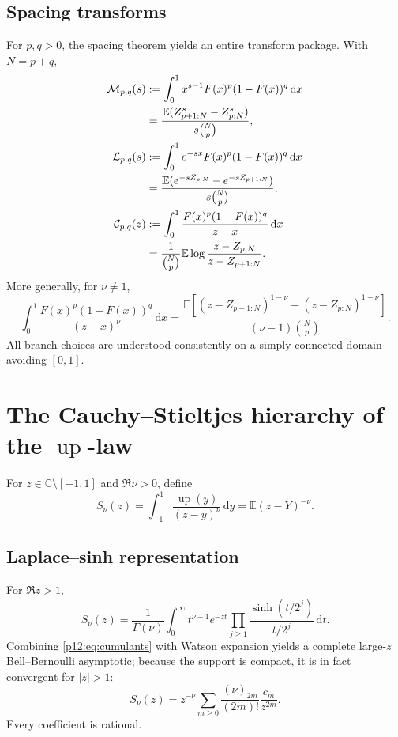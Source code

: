 \documentclass[11pt,oneside]{article}
\theoremstyle{definition}
\theoremstyle{remark}
\newcommand{\F}{F}
\newcommand{\Up}{\operatorname{up}}
\newcommand{\E}{\mathbb E}
\newcommand{\C}{\mathbb C}
\newcommand{\dd}{\,\mathrm d}
\newcommand{\1}{\mathbf 1}
\begin{document}
\subsection{Spacing transforms}

For \(p,q>0\), the spacing theorem yields an entire transform package.  With
\(N=p+q\),
\begin{align}
 \mathcal M_{p,q}(s)
 &:=\int_0^1x^{s-1}\F(x)^p(1-\F(x))^q\dd x\notag\\
 &=\frac{\E(Z_{p+1:N}^s-Z_{p:N}^s)}{s\binom Np},\label{p12:eq:spacingMellin}\\
 \mathcal L_{p,q}(s)
 &:=\int_0^1e^{-sx}\F(x)^p(1-\F(x))^q\dd x\notag\\
 &=\frac{\E(e^{-sZ_{p:N}}-e^{-sZ_{p+1:N}})}{s\binom Np},\label{p12:eq:spacingLaplace}\\
 \mathcal C_{p,q}(z)
 &:=\int_0^1\frac{\F(x)^p(1-\F(x))^q}{z-x}\dd x\notag\\
 &=\frac1{\binom Np}\E\log\frac{z-Z_{p:N}}{z-Z_{p+1:N}}.\label{p12:eq:spacingCauchy}
\end{align}
More generally, for \(\nu\ne1\),
\begin{equation}\label{p12:eq:spacingStieltjes}
 \int_0^1\frac{\F(x)^p(1-\F(x))^q}{(z-x)^\nu}\dd x
 =\frac{\E[(z-Z_{p+1:N})^{1-\nu}-(z-Z_{p:N})^{1-\nu}]}
 {(\nu-1)\binom Np}.
\end{equation}
All branch choices are understood consistently on a simply connected domain
avoiding \([0,1]\).

\section{The Cauchy--Stieltjes hierarchy of the \(\Up\)-law}

For \(z\in\C\setminus[-1,1]\) and \(\Re\nu>0\), define
\begin{equation}\label{p12:eq:Snu}
 S_\nu(z)=\int_{-1}^1\frac{\Up(y)}{(z-y)^\nu}\dd y
 =\E(z-Y)^{-\nu}.
\end{equation}

\subsection{Laplace--sinh representation}

For \(\Re z>1\),
\begin{equation}\label{p12:eq:SnuLaplace}
 S_\nu(z)=\frac1{\Gamma(\nu)}
 \int_0^\infty t^{\nu-1}e^{-zt}
 \prod_{j\ge1}\frac{\sinh(t/2^j)}{t/2^j}\dd t.
\end{equation}
Combining \eqref{p12:eq:cumulants} with Watson expansion yields a complete
large-\(z\) Bell--Bernoulli asymptotic; because the support is compact, it is in
fact convergent for \(|z|>1\):
\begin{equation}\label{p12:eq:Snumoments}
 S_\nu(z)=z^{-\nu}
 \sum_{m\ge0}\frac{(\nu)_{2m}}{(2m)!}\frac{c_m}{z^{2m}}.
\end{equation}
Every coefficient is rational.
\end{document}
